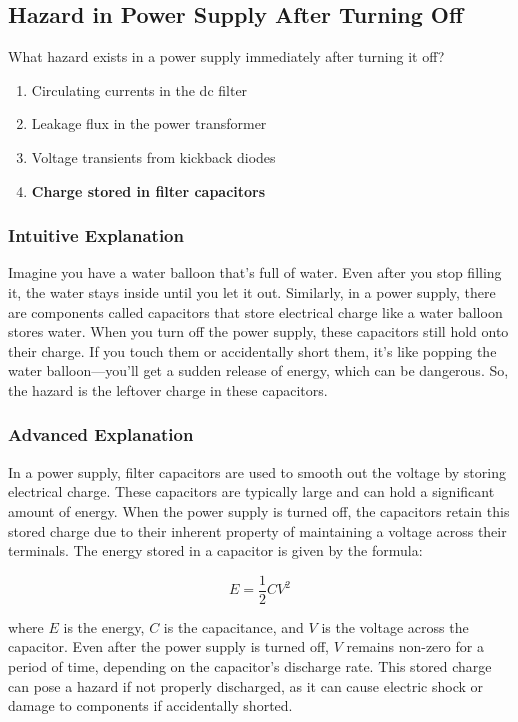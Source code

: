 \subsection{Hazard in Power Supply After Turning Off}
\label{T0A11}

\begin{tcolorbox}[colback=gray!10!white,colframe=black!75!black,title=T0A11]
What hazard exists in a power supply immediately after turning it off?
\begin{enumerate}[label=\Alph*)]
    \item Circulating currents in the dc filter
    \item Leakage flux in the power transformer
    \item Voltage transients from kickback diodes
    \item \textbf{Charge stored in filter capacitors}
\end{enumerate}
\end{tcolorbox}

\subsubsection{Intuitive Explanation}
Imagine you have a water balloon that's full of water. Even after you stop filling it, the water stays inside until you let it out. Similarly, in a power supply, there are components called capacitors that store electrical charge like a water balloon stores water. When you turn off the power supply, these capacitors still hold onto their charge. If you touch them or accidentally short them, it's like popping the water balloon—you'll get a sudden release of energy, which can be dangerous. So, the hazard is the leftover charge in these capacitors.

\subsubsection{Advanced Explanation}
In a power supply, filter capacitors are used to smooth out the voltage by storing electrical charge. These capacitors are typically large and can hold a significant amount of energy. When the power supply is turned off, the capacitors retain this stored charge due to their inherent property of maintaining a voltage across their terminals. The energy stored in a capacitor is given by the formula:

\[
E = \frac{1}{2} C V^2
\]

where \(E\) is the energy, \(C\) is the capacitance, and \(V\) is the voltage across the capacitor. Even after the power supply is turned off, \(V\) remains non-zero for a period of time, depending on the capacitor's discharge rate. This stored charge can pose a hazard if not properly discharged, as it can cause electric shock or damage to components if accidentally shorted.

